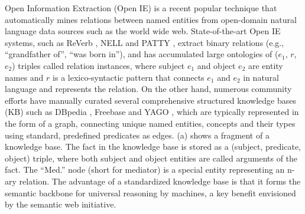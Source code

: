 
Open Information Extraction (Open IE) is a recent popular technique
that automatically mines relations between named entities
from open-domain natural language
data sources such as the world wide web.
State-of-the-art Open IE systems, such as ReVerb \cite{fader2011identifying},
NELL \cite{carlson2010toward} and PATTY \cite{nakashole2012patty}, extract binary
relations (e.g., ``grandfather of'', ``was born in''), and has accumulated large
ontologies of ($e_1$, $r$, $e_2$) triples called relation instances, where subject $e_1$ and object $e_2$ are
entity names and $r$ is a lexico-syntactic pattern that connects
$e_1$ and $e_2$ in natural language and represents the relation.
On the other hand, numerous community efforts have
manually curated several comprehensive structured knowledge bases (KB)
such as DBpedia \cite{auer2007dbpedia}, 
Freebase \cite{bollacker2008freebase} and YAGO \cite{suchanek2007yago}, 
which are typically represented in the form of a graph,
connecting unique named entities, concepts and their types
using standard, predefined predicates as edges.
(a) shows a fragment of a knowledge base.
The fact in the knowledge base is stored as a (subject, predicate, object) triple,
where both subject and object entities are called arguments of the fact.
The ``Med.'' node (short for mediator) is a special entity representing 
an n-ary relation.
The advantage of a standardized knowledge base is that it forms the
semantic backbone for universal reasoning by machines,
a key benefit envisioned by the semantic web initiative.

